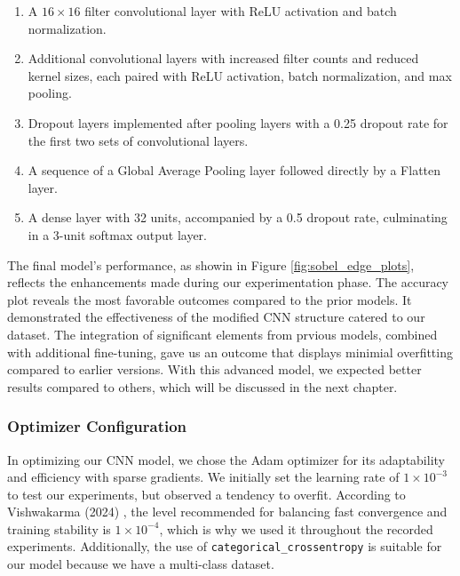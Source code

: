 \begin{enumerate}
  \item A $16 \times 16$ filter convolutional layer with ReLU activation and batch normalization.
  \item Additional convolutional layers with increased filter counts and reduced kernel sizes, each paired with ReLU activation, batch normalization, and max pooling.
  \item Dropout layers implemented after pooling layers with a 0.25 dropout rate for the first two sets of convolutional layers.
  \item A sequence of a Global Average Pooling layer followed directly by a Flatten layer.
  \item A dense layer with 32 units, accompanied by a 0.5 dropout rate, culminating in a 3-unit softmax output layer.
\end{enumerate}

The final model's performance, as showin in Figure \ref{fig:sobel_edge_plots}, reflects the enhancements made during our experimentation phase. The accuracy plot reveals the most favorable outcomes compared to the prior models. It demonstrated the effectiveness of the modified CNN structure catered to our dataset. The integration of significant elements from prvious models, combined with additional fine-tuning, gave us an outcome that displays minimial overfitting compared to earlier versions. With this advanced model, we expected better results compared to others, which will be discussed in the next chapter. 

\subsubsection{Optimizer Configuration}

In optimizing our CNN model, we chose the Adam optimizer for its adaptability and efficiency with sparse gradients. We initially set the learning rate of $1 \times 10^{-3}$ to test our experiments, but observed a tendency to overfit. According to Vishwakarma (2024) \cite{adam_optimizer}, the level recommended for balancing fast convergence and training stability is \(1 \times 10^{-4}\), which is why we used it throughout the recorded experiments. Additionally, the use of \texttt{categorical\_crossentropy} is suitable for our model because we have a multi-class dataset.
